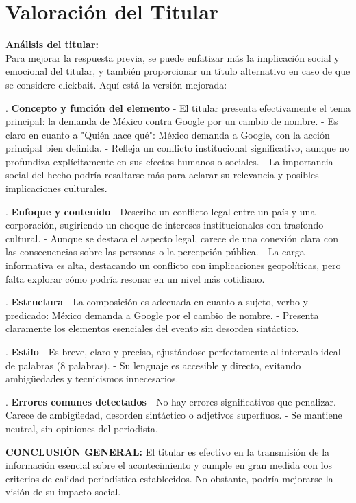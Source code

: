 \documentclass[10pt,a4paper]{article}
\begin{document}
\section*{Valoración del Titular}
        \textbf{Análisis del titular:} \\ 
        Para mejorar la respuesta previa, se puede enfatizar m\'{a}s la implicaci\'{o}n social y emocional del titular, y tambi\'{e}n proporcionar un t\'{i}tulo alternativo en caso de que se considere clickbait. Aqu\'{i} est\'{a} la versi\'{o}n mejorada:
\par{}. \textbf{Concepto y funci\'{o}n del elemento}    - El titular presenta efectivamente el tema principal: la demanda de M\'{e}xico contra Google por un cambio de nombre.     - Es claro en cuanto a "Qui\'{e}n hace qu\'{e}": M\'{e}xico demanda a Google, con la acci\'{o}n principal bien definida.    - Refleja un conflicto institucional significativo, aunque no profundiza expl\'{i}citamente en sus efectos humanos o sociales.    - La importancia social del hecho podr\'{i}a resaltarse m\'{a}s para aclarar su relevancia y posibles implicaciones culturales.
\par{}. \textbf{Enfoque y contenido}    - Describe un conflicto legal entre un pa\'{i}s y una corporaci\'{o}n, sugiriendo un choque de intereses institucionales con trasfondo cultural.    - Aunque se destaca el aspecto legal, carece de una conexi\'{o}n clara con las consecuencias sobre las personas o la percepci\'{o}n p\'{u}blica.    - La carga informativa es alta, destacando un conflicto con implicaciones geopol\'{i}ticas, pero falta explorar c\'{o}mo podr\'{i}a resonar en un nivel m\'{a}s cotidiano.
\par{}. \textbf{Estructura}    - La composici\'{o}n es adecuada en cuanto a sujeto, verbo y predicado: M\'{e}xico demanda a Google por el cambio de nombre.    - Presenta claramente los elementos esenciales del evento sin desorden sint\'{a}ctico.
\par{}. \textbf{Estilo}    - Es breve, claro y preciso, ajust\'{a}ndose perfectamente al intervalo ideal de palabras (8 palabras).    - Su lenguaje es accesible y directo, evitando ambig\"{u}edades y tecnicismos innecesarios.
\par{}. \textbf{Errores comunes detectados}    - No hay errores significativos que penalizar.    - Carece de ambig\"{u}edad, desorden sint\'{a}ctico o adjetivos superfluos.    - Se mantiene neutral, sin opiniones del periodista.
\par\medskip
\textbf{CONCLUSI\'{O}N GENERAL:} El titular es efectivo en la transmisi\'{o}n de la informaci\'{o}n esencial sobre el acontecimiento y cumple en gran medida con los criterios de calidad period\'{i}stica establecidos. No obstante, podr\'{i}a mejorarse la visi\'{o}n de su impacto social.
\end{document}
